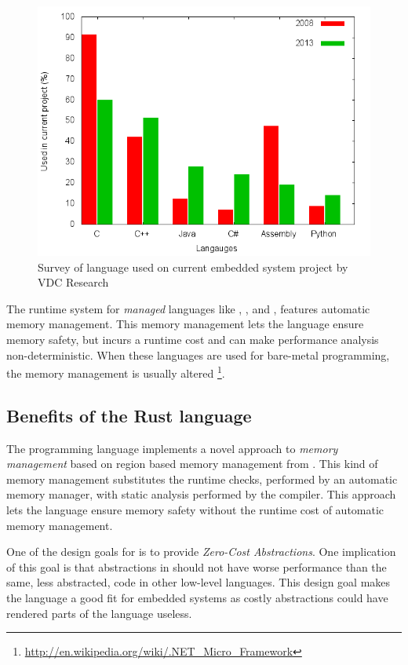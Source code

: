 \begin{figure}[H]
  \begin{center}
    \includegraphics[scale=0.5]{figures/plots/langs.png}
  \end{center}
  \caption{Survey of language used on current embedded system project by VDC Research}
  \label{fig:vdc:langs}
\end{figure}

The runtime system for \emph{managed} languages like {\Java}, , and , features automatic memory management.
This memory management lets the language ensure memory safety, but incurs a runtime cost and can make performance analysis non-deterministic.
When these languages are used for bare-metal programming, the memory management is usually altered \cite{PetitBianco} \cite{Pizlo} \footnote{\url{http://en.wikipedia.org/wiki/.NET_Micro_Framework}}.

\subsection{Benefits of the Rust language}
The {\rust} programming language implements a novel approach to \emph{memory management} based on region based memory management from  \cite{Grossman2002,Swamy2006}.
This kind of memory management substitutes the runtime checks, performed by an automatic memory manager, with static analysis performed by the compiler.
This approach lets the {\rust} language ensure memory safety without the runtime cost of automatic memory management.

One of the design goals for {\rust} is to provide \emph{Zero-Cost Abstractions}.
One implication of this goal is that abstractions in {\rust} should not have worse performance than the same, less abstracted, code in other low-level languages.
This design goal makes the language a good fit for embedded systems as costly abstractions could have rendered parts of the language useless.


